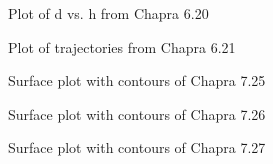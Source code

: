 \documentclass{article}
\begin{document}
\begin{figure}[htb!]
\begin{center}
\caption{Plot of d vs. h from Chapra 6.20}
\end{center}
\end{figure}

\begin{figure}[htb!]
\begin{center}
\caption{Plot of trajectories from Chapra 6.21}
\end{center}
\end{figure}

\begin{figure}[htb!]
\begin{center}
\caption{Surface plot with contours of Chapra 7.25}
\end{center}
\end{figure}

\begin{figure}[htb!]
\begin{center}
\caption{Surface plot with contours of Chapra 7.26}
\end{center}
\end{figure}

\begin{figure}[htb!]
\begin{center}
\caption{Surface plot with contours of Chapra 7.27}
\end{center}
\end{figure}
\end{document}
